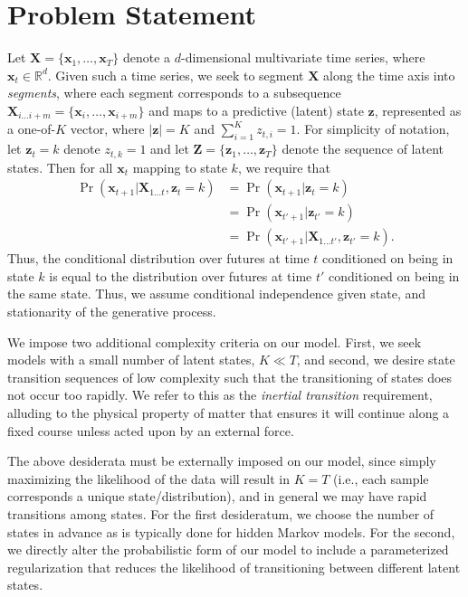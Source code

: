 \documentclass[12pt]{article}
\begin{document}
\section{Problem Statement}

Let $\mathbf{X} = \{\mathbf{x}_1, \ldots, \mathbf{x}_T\}$ denote a $d$-dimensional multivariate time series, where $\mathbf{x}_t \in \mathbb{R}^d$. Given such a time series, we seek to segment $\mathbf{X}$ along the time axis into \emph{segments}, where each segment corresponds to a subsequence $\mathbf{X}_{i\ldots i+m} = \{\mathbf{x}_i, \ldots, \mathbf{x}_{i+m}\}$ and maps to a predictive (latent) state $\mathbf{z}$, represented as a one-of-$K$ vector, where $|\mathbf{z}| = K$ and $\sum_{i=1}^{K}z_{t,i} = 1$. For simplicity of notation, let $\mathbf{z}_{t} = k$ denote $z_{t,k} = 1$ and let $\mathbf{Z} = \{\mathbf{z}_1, \ldots, \mathbf{z}_T\}$ denote the sequence of latent states. Then for all $\mathbf{x}_{t}$ mapping to state $k$, we require that
\begin{align*}
    \Pr(\mathbf{x}_{t+1}|\mathbf{X}_{1\ldots t}, \mathbf{z}_t = k) &= \Pr(\mathbf{x}_{t+1}| \mathbf{z}_t = k) \\
                                                                   &= \Pr(\mathbf{x}_{t'+1}| \mathbf{z}_{t'} = k) \\
                                                                   &= \Pr(\mathbf{x}_{t'+1}| \mathbf{X}_{1\ldots t'}, \mathbf{z}_{t'} = k).
\end{align*}
Thus, the conditional distribution over futures at time $t$ conditioned on being in state $k$ is equal to the distribution over futures at time $t'$ conditioned on being in the same state. Thus, we assume conditional independence given state, and stationarity of the generative process.

We impose two additional complexity criteria on our model. First, we seek models with a small number of latent states, $K \ll T$, and second, we desire state transition sequences of low complexity such that the transitioning of states does not occur too rapidly. We refer to this as the \emph{inertial transition} requirement, alluding to the physical property of matter that ensures it will continue along a fixed course unless acted upon by an external force. 

The above desiderata must be externally imposed on our model, since simply maximizing the likelihood of the data will result in $K = T$ (i.e., each sample corresponds a unique state/distribution), and in general we may have rapid transitions among states. For the first desideratum,  we choose the number of states in advance as is typically done for hidden Markov models. For the second, we directly alter the probabilistic form of our model to include a parameterized regularization that reduces the likelihood of transitioning between different latent states.
\end{document}
